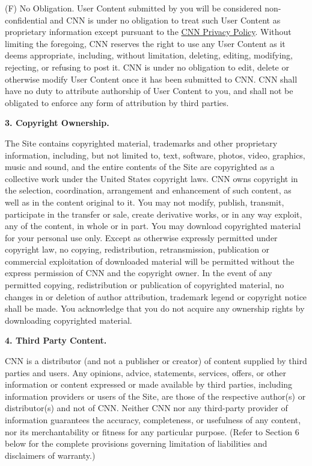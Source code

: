 (F) No Obligation. User Content submitted by you will be considered
non-confidential and CNN is under no obligation to treat such User
Content as proprietary information except pursuant to the
\href{http://www.cnn.com/privacy}{CNN Privacy Policy}. Without limiting
the foregoing, CNN reserves the right to use any User Content as it
deems appropriate, including, without limitation, deleting, editing,
modifying, rejecting, or refusing to post it. CNN is under no obligation
to edit, delete or otherwise modify User Content once it has been
submitted to CNN. CNN shall have no duty to attribute authorship of User
Content to you, and shall not be obligated to enforce any form of
attribution by third parties.

\textbf{3. Copyright Ownership.}

The Site contains copyrighted material, trademarks and other proprietary
information, including, but not limited to, text, software, photos,
video, graphics, music and sound, and the entire contents of the Site
are copyrighted as a collective work under the United States copyright
laws. CNN owns copyright in the selection, coordination, arrangement and
enhancement of such content, as well as in the content original to it.
You may not modify, publish, transmit, participate in the transfer or
sale, create derivative works, or in any way exploit, any of the
content, in whole or in part. You may download copyrighted material for
your personal use only. Except as otherwise expressly permitted under
copyright law, no copying, redistribution, retransmission, publication
or commercial exploitation of downloaded material will be permitted
without the express permission of CNN and the copyright owner. In the
event of any permitted copying, redistribution or publication of
copyrighted material, no changes in or deletion of author attribution,
trademark legend or copyright notice shall be made. You acknowledge that
you do not acquire any ownership rights by downloading copyrighted
material.

\textbf{4. Third Party Content.}

CNN is a distributor (and not a publisher or creator) of content
supplied by third parties and users. Any opinions, advice, statements,
services, offers, or other information or content expressed or made
available by third parties, including information providers or users of
the Site, are those of the respective author(s) or distributor(s) and
not of CNN. Neither CNN nor any third-party provider of information
guarantees the accuracy, completeness, or usefulness of any content, nor
its merchantability or fitness for any particular purpose. (Refer to
Section 6 below for the complete provisions governing limitation of
liabilities and disclaimers of warranty.)

